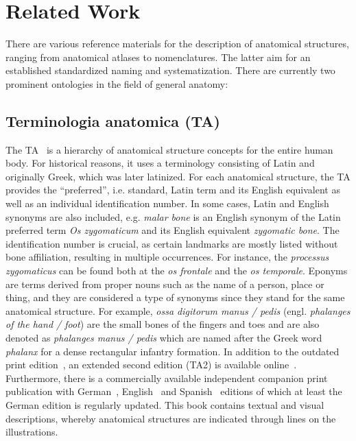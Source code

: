 \documentclass[sw]{iosart2x}
\begin{document}
\section{Related Work}

There are various reference materials for the description of anatomical structures, ranging from anatomical atlases to nomenclatures.
The latter aim for an established standardized naming and systematization.
There are currently two prominent ontologies in the field of general anatomy:

\subsection{Terminologia anatomica (TA)}
The TA~\citep{ta2} is a hierarchy of anatomical structure concepts for the entire human body.
For historical reasons, it uses a terminology consisting of Latin and originally Greek, which was later latinized.
For each anatomical structure, the TA provides the \enquote{preferred}, i.e. standard, Latin term and its English equivalent as well as an individual identification number.
In some cases, Latin and English synonyms are also included, e.g. \emph{malar bone} is an English synonym of the Latin preferred term \emph{Os zygomaticum} and its English equivalent \emph{zygomatic bone}.
The identification number is crucial, as certain landmarks are mostly listed without bone affiliation, resulting in multiple occurrences. %
For instance, the \emph{processus zygomaticus} can be found both at the \emph{os frontale} and the \emph{os temporale}.
Eponyms are terms derived from proper nouns such as the name of a person, place or thing, and they are considered a type of synonyms since they stand for the same anatomical structure.
For example, \emph{ossa digitorum manus / pedis} (engl. \emph{phalanges of the hand / foot}) are the small bones of the fingers and toes and are also denoted as \emph{phalanges manus / pedis} which are named after the Greek word \emph{phalanx} for a dense rectangular infantry formation.
In addition to the outdated print edition~\citep{ta1998}, an extended second edition (TA2) is available online~\citep{ta2}.
Furthermore, there is a commercially available independent companion print publication with German~\citep{anatomylexicon}, English~\citep{pocketatlas} and Spanish~\citep{taspanish} editions of which at least the German edition is regularly updated.
This book contains textual and visual descriptions, whereby anatomical structures are indicated through lines on the illustrations.
\end{document}
